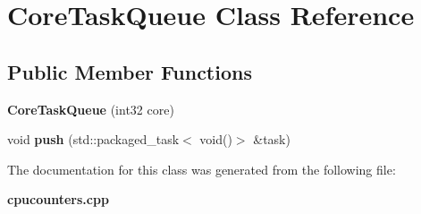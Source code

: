 \section{Core\+Task\+Queue Class Reference}
\label{classCoreTaskQueue}
\subsection*{Public Member Functions}
\begin{DoxyCompactItemize}
\item 
\mbox{\label{classCoreTaskQueue_ae0748611bfea1406cdcae5469e6983ec}} 
{\bfseries Core\+Task\+Queue} (int32 core)
\item 
\mbox{\label{classCoreTaskQueue_affede6b8b5d78bbf64214f7a2f2badaf}} 
void {\bfseries push} (std\+::packaged\+\_\+task$<$ void()$>$ \&task)
\end{DoxyCompactItemize}


The documentation for this class was generated from the following file\+:\begin{DoxyCompactItemize}
\item 
\textbf{ cpucounters.\+cpp}\end{DoxyCompactItemize}
